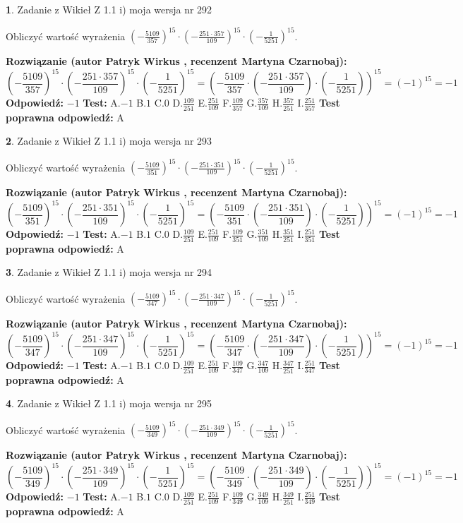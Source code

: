 \documentclass[12pt, a4paper]{article}
\theoremstyle{definition} %
\newtheorem{zad}{}
\newcommand{\zadStart}[1]{\begin{zad}#1\newline}
\newcommand{\zadStop}{\end{zad}}
\newcommand{\rozwStart}[2]{\noindent \textbf{Rozwiązanie (autor #1 , recenzent #2): }\newline}
\newcommand{\rozwStop}{\newline}
\newcommand{\odpStart}{\noindent \textbf{Odpowiedź:}\newline}
\newcommand{\odpStop}{\newline}
\newcommand{\testStart}{\noindent \textbf{Test:}\newline}
\newcommand{\testStop}{\newline}
\newcommand{\kluczStart}{\noindent \textbf{Test poprawna odpowiedź:}\newline}
\newcommand{\kluczStop}{\newline}
\begin{document}
\zadStart{Zadanie z Wikieł Z 1.1 i) moja wersja nr 292}

Obliczyć wartość wyrażenia $(-\frac{5109}{357})^{15} \cdot (-\frac{251 \cdot 357}{109})^{15} \cdot (-\frac{1}{5251})^{15}$.
\zadStop
\rozwStart{Patryk Wirkus}{Martyna Czarnobaj}
$$(-\frac{5109}{357})^{15} \cdot (-\frac{251 \cdot 357}{109})^{15} \cdot (-\frac{1}{5251})^{15} = (-\frac{5109}{357} \cdot (-\frac{251 \cdot 357}{109}) \cdot (-\frac{1}{5251}))^{15} = (-1)^{15} = -1$$
\rozwStop
\odpStart
$-1$
\odpStop
\testStart
A.$-1$ B.$1$ C.$0$ D.$\frac{109}{251}$ E.$\frac{251}{109}$
F.$\frac{109}{357}$ G.$\frac{357}{109}$
H.$\frac{357}{251}$
I.$\frac{251}{357}$
\testStop
\kluczStart
A
\kluczStop



\zadStart{Zadanie z Wikieł Z 1.1 i) moja wersja nr 293}

Obliczyć wartość wyrażenia $(-\frac{5109}{351})^{15} \cdot (-\frac{251 \cdot 351}{109})^{15} \cdot (-\frac{1}{5251})^{15}$.
\zadStop
\rozwStart{Patryk Wirkus}{Martyna Czarnobaj}
$$(-\frac{5109}{351})^{15} \cdot (-\frac{251 \cdot 351}{109})^{15} \cdot (-\frac{1}{5251})^{15} = (-\frac{5109}{351} \cdot (-\frac{251 \cdot 351}{109}) \cdot (-\frac{1}{5251}))^{15} = (-1)^{15} = -1$$
\rozwStop
\odpStart
$-1$
\odpStop
\testStart
A.$-1$ B.$1$ C.$0$ D.$\frac{109}{251}$ E.$\frac{251}{109}$
F.$\frac{109}{351}$ G.$\frac{351}{109}$
H.$\frac{351}{251}$
I.$\frac{251}{351}$
\testStop
\kluczStart
A
\kluczStop



\zadStart{Zadanie z Wikieł Z 1.1 i) moja wersja nr 294}

Obliczyć wartość wyrażenia $(-\frac{5109}{347})^{15} \cdot (-\frac{251 \cdot 347}{109})^{15} \cdot (-\frac{1}{5251})^{15}$.
\zadStop
\rozwStart{Patryk Wirkus}{Martyna Czarnobaj}
$$(-\frac{5109}{347})^{15} \cdot (-\frac{251 \cdot 347}{109})^{15} \cdot (-\frac{1}{5251})^{15} = (-\frac{5109}{347} \cdot (-\frac{251 \cdot 347}{109}) \cdot (-\frac{1}{5251}))^{15} = (-1)^{15} = -1$$
\rozwStop
\odpStart
$-1$
\odpStop
\testStart
A.$-1$ B.$1$ C.$0$ D.$\frac{109}{251}$ E.$\frac{251}{109}$
F.$\frac{109}{347}$ G.$\frac{347}{109}$
H.$\frac{347}{251}$
I.$\frac{251}{347}$
\testStop
\kluczStart
A
\kluczStop



\zadStart{Zadanie z Wikieł Z 1.1 i) moja wersja nr 295}

Obliczyć wartość wyrażenia $(-\frac{5109}{349})^{15} \cdot (-\frac{251 \cdot 349}{109})^{15} \cdot (-\frac{1}{5251})^{15}$.
\zadStop
\rozwStart{Patryk Wirkus}{Martyna Czarnobaj}
$$(-\frac{5109}{349})^{15} \cdot (-\frac{251 \cdot 349}{109})^{15} \cdot (-\frac{1}{5251})^{15} = (-\frac{5109}{349} \cdot (-\frac{251 \cdot 349}{109}) \cdot (-\frac{1}{5251}))^{15} = (-1)^{15} = -1$$
\rozwStop
\odpStart
$-1$
\odpStop
\testStart
A.$-1$ B.$1$ C.$0$ D.$\frac{109}{251}$ E.$\frac{251}{109}$
F.$\frac{109}{349}$ G.$\frac{349}{109}$
H.$\frac{349}{251}$
I.$\frac{251}{349}$
\testStop
\kluczStart
A
\kluczStop
\end{document}
